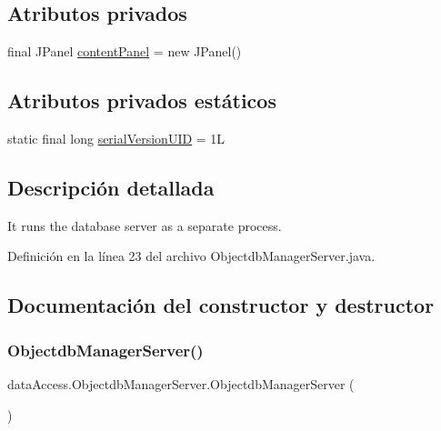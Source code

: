 \subsection*{Atributos privados}
\begin{DoxyCompactItemize}
\item 
final J\+Panel \mbox{\hyperlink{classdataAccess_1_1ObjectdbManagerServer_ad26f12e877ed4c593d4444ece4309e6c}{content\+Panel}} = new J\+Panel()
\end{DoxyCompactItemize}
\subsection*{Atributos privados estáticos}
\begin{DoxyCompactItemize}
\item 
static final long \mbox{\hyperlink{classdataAccess_1_1ObjectdbManagerServer_aecacee957a38daebfb09c8b326497696}{serial\+Version\+U\+ID}} = 1L
\end{DoxyCompactItemize}


\subsection{Descripción detallada}
It runs the database server as a separate process. 

Definición en la línea 23 del archivo Objectdb\+Manager\+Server.\+java.



\subsection{Documentación del constructor y destructor}
\mbox{\label{classdataAccess_1_1ObjectdbManagerServer_a6aac62b0bbbebbb54d3105d5820c0061}} 
\subsubsection{\texorpdfstring{ObjectdbManagerServer()}{ObjectdbManagerServer()}}
{\footnotesize\ttfamily data\+Access.\+Objectdb\+Manager\+Server.\+Objectdb\+Manager\+Server (\begin{DoxyParamCaption}{ }\end{DoxyParamCaption})}



